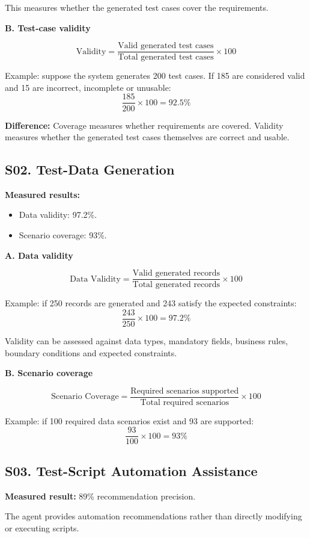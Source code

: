 \documentclass[11pt,a4paper]{article}
\begin{document}
This measures whether the generated test cases cover the requirements.

\textbf{B. Test-case validity}

\[
\text{Validity} =
\frac{\text{Valid generated test cases}}
     {\text{Total generated test cases}}\times 100
\]

Example: suppose the system generates 200 test cases. If 185 are considered valid and 15 are incorrect, incomplete or unusable:
\[
\frac{185}{200}\times 100=92.5\%
\]

\textbf{Difference:} Coverage measures whether requirements are covered. Validity measures whether the generated test cases themselves are correct and usable.

\subsection{S02. Test-Data Generation}

\textbf{Measured results:}
\begin{itemize}
  \item Data validity: 97.2\%.
  \item Scenario coverage: 93\%.
\end{itemize}

\textbf{A. Data validity}

\[
\text{Data Validity} =
\frac{\text{Valid generated records}}
     {\text{Total generated records}}\times 100
\]

Example: if 250 records are generated and 243 satisfy the expected constraints:
\[
\frac{243}{250}\times 100=97.2\%
\]

Validity can be assessed against data types, mandatory fields, business rules, boundary conditions and expected constraints.

\textbf{B. Scenario coverage}

\[
\text{Scenario Coverage} =
\frac{\text{Required scenarios supported}}
     {\text{Total required scenarios}}\times 100
\]

Example: if 100 required data scenarios exist and 93 are supported:
\[
\frac{93}{100}\times 100=93\%
\]

\subsection{S03. Test-Script Automation Assistance}

\textbf{Measured result:} 89\% recommendation precision.

The agent provides automation recommendations rather than directly modifying or executing scripts.
\end{document}
